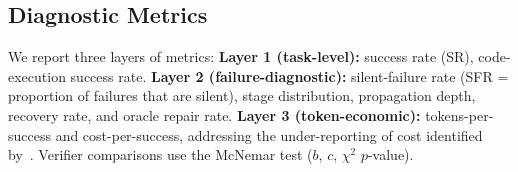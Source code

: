 \subsection{Diagnostic Metrics}
\label{sec:metrics}

We report three layers of metrics: \textbf{Layer 1 (task-level):} success rate (SR), code-execution success rate. \textbf{Layer 2 (failure-diagnostic):} silent-failure rate (SFR = proportion of failures that are silent), stage distribution, propagation depth, recovery rate, and oracle repair rate. \textbf{Layer 3 (token-economic):} tokens-per-success and cost-per-success, addressing the under-reporting of cost identified by~\citet{moghadasi2026what}. Verifier comparisons use the McNemar test ($b$, $c$, $\chi^2$ $p$-value).

